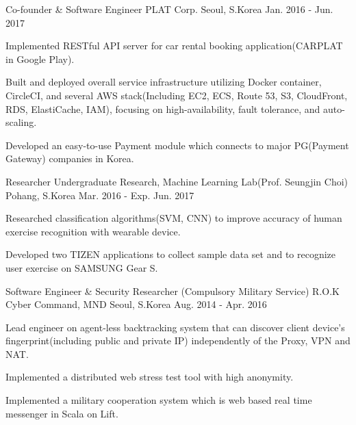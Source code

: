 \begin{cventries}
  \cventry
    {Co-founder \& Software Engineer} %
    {PLAT Corp.} %
    {Seoul, S.Korea} %
    {Jan. 2016 - Jun. 2017} %
    {
      \begin{cvitems} %
        \item {Implemented RESTful API server for car rental booking application(CARPLAT in Google Play).}
        \item {Built and deployed overall service infrastructure utilizing Docker container, CircleCI, and several AWS stack(Including EC2, ECS, Route 53, S3, CloudFront, RDS, ElastiCache, IAM), focusing on high-availability, fault tolerance, and auto-scaling.}
        \item {Developed an easy-to-use Payment module which connects to major PG(Payment Gateway) companies in Korea.}
      \end{cvitems}
    }
    {}

  \cventry
    {Researcher} %
    {Undergraduate Research, Machine Learning Lab(Prof. Seungjin Choi)} %
    {Pohang, S.Korea} %
    {Mar. 2016 - Exp. Jun. 2017} %
    {
      \begin{cvitems} %
        \item {Researched classification algorithms(SVM, CNN) to improve accuracy of human exercise recognition with wearable device.}
        \item {Developed two TIZEN applications to collect sample data set and to recognize user exercise on SAMSUNG Gear S.}
      \end{cvitems}
    }
    {}

  \cventry
    {Software Engineer \& Security Researcher (Compulsory Military Service)} %
    {R.O.K Cyber Command, MND} %
    {Seoul, S.Korea} %
    {Aug. 2014 - Apr. 2016} %
    {
      \begin{cvitems} %
        \item {Lead engineer on agent-less backtracking system that can discover client device's fingerprint(including public and private IP) independently of the Proxy, VPN and NAT.}
        \item {Implemented a distributed web stress test tool with high anonymity.}
        \item {Implemented a military cooperation system which is web based real time messenger in Scala on Lift.}
      \end{cvitems}
    }
    {}


\end{cventries}
